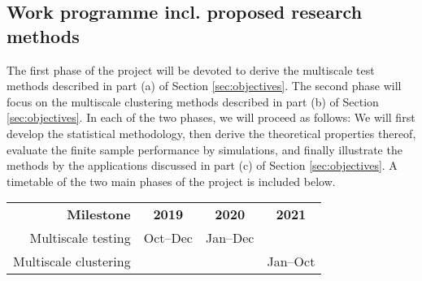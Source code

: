 \documentclass[a4paper,12pt]{article}
\begin{document}
\subsection{Work programme incl. proposed research methods}


The first phase of the project will be devoted to derive the multiscale test methods described in part (a) of Section \ref{sec:objectives}. The second phase will focus on the multiscale clustering methods described in part (b) of Section \ref{sec:objectives}. In each of the two phases, we will proceed as follows: We will first develop the statistical methodology, then derive the theoretical properties thereof, evaluate the finite sample performance by simulations, and finally illustrate the methods by the applications discussed in part (c) of Section \ref{sec:objectives}. A timetable of the two main phases of the project is included below. 

\begin{center}
\begin{tabular}{r c c c}
{\bf Milestone} & {\bf 2019} & {\bf 2020} & {\bf 2021} \\
Multiscale testing & Oct--Dec & Jan--Dec & \\
Multiscale clustering & & & Jan--Oct
\end{tabular}
\end{center}







\end{document}
